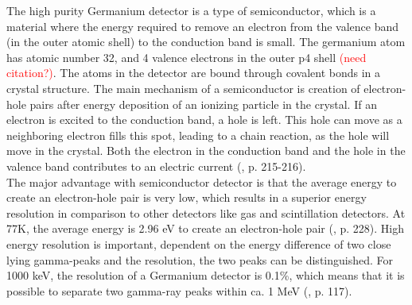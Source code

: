 \noindent 
The high purity Germanium detector is a type of semiconductor, which is a material where the energy required to remove an electron from the valence band (in the outer atomic shell) to the conduction band is small. The germanium atom has atomic number 32, and 4 valence electrons in the outer p4 shell \textcolor{red}{(need citation?)}. The atoms in the detector are bound through covalent bonds in a crystal structure. The main mechanism of a semiconductor is creation of electron-hole pairs after energy deposition of an ionizing particle in the crystal. If an electron is excited to the conduction band, a hole is left. This hole can move as a neighboring electron fills this spot, leading to a chain reaction, as the hole will move in the crystal. Both the electron in the conduction band and the hole in the valence band contributes to an electric current (\cite{Leo1994}, p. 215-216). \\ The major advantage with semiconductor detector is that the average energy to create an electron-hole pair is very low, which results in a superior energy resolution in comparison to other detectors like gas and scintillation detectors. At 77K, the average energy is 2.96 eV to create an electron-hole pair (\cite{Leo1994}, p. 228).  High energy resolution is important, dependent on the energy difference of two close lying gamma-peaks and the resolution, the two peaks can be distinguished. For 1000 keV, the resolution of a Germanium detector is 0.1\%, which means that it is possible to separate two gamma-ray peaks within ca. 1 MeV (\cite{Leo1994}, p. 117). \\

